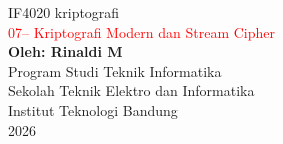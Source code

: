 \documentclass{article}
\begin{document}

\begin{center}
{\huge IF4020 kriptografi} \\
\vspace{10mm}
{\Huge \textcolor{red}{07-- Kriptografi Modern dan Stream Cipher}} \\
\vspace{20mm}
\textbf{Oleh: Rinaldi M} \\
\vspace{10mm}
Program Studi Teknik Informatika \\
Sekolah Teknik Elektro dan Informatika \\
Institut Teknologi Bandung \\
2026
\end{center}
\end{document}

